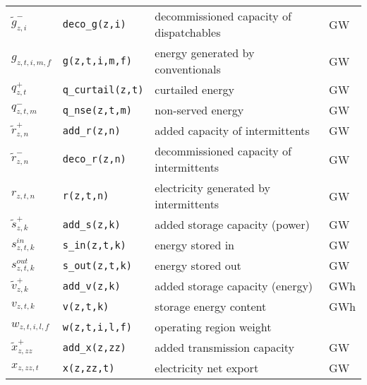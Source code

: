 \documentclass[review, 3p, times]{elsarticle} %
\begin{document}
\begin{table*}
\begin{tabulary}{\textwidth}{LLLL}
            $\widetilde{g}^{-}_{z,i}$     & \texttt{deco\_g(z,i)}         & decommissioned capacity of dispatchables & GW        \\
            $g_{z,t,i,m,f}$               & \texttt{g(z,t,i,m,f)}         & energy generated by conventionals & GW        \\
            $q^{+}_{z,t}$                 & \texttt{q\_curtail(z,t)}      & curtailed energy & GW        \\
            $q^{-}_{z,t,m}$               & \texttt{q\_nse(z,t,m)}        & non-served energy & GW        \\
            $\widetilde{r}^{+}_{z,n}$     & \texttt{add\_r(z,n)}          & added capacity of intermittents & GW        \\
            $\widetilde{r}^{-}_{z,n}$     & \texttt{deco\_r(z,n)}         & decommissioned capacity of intermittents & GW        \\
            $r_{z,t,n}$                   & \texttt{r(z,t,n)}             & electricity generated by intermittents & GW        \\
            $\widetilde{s}^{+}_{z,k}$     & \texttt{add\_s(z,k)}          & added storage capacity (power)              & GW        \\
            $s^{in}_{z,t,k}$              & \texttt{s\_in(z,t,k)}         & energy stored in & GW        \\
            $s^{out}_{z,t,k}$             & \texttt{s\_out(z,t,k)}        & energy stored out & GW        \\
            $\widetilde{v}^{+}_{z,k}$     & \texttt{add\_v(z,k)}          & added storage capacity (energy)             & GWh       \\
            $v_{z,t,k}$                   & \texttt{v(z,t,k)}             & storage energy content & GWh       \\
            $w_{z,t,i,l,f}$               & \texttt{w(z,t,i,l,f)}         & operating region weight &           \\
            $\widetilde{x}^{+}_{z,zz}$    & \texttt{add\_x(z,zz)}         & added transmission capacity & GW        \\
            $x_{z,zz,t}$                  & \texttt{x(z,zz,t)}            & electricity net export & GW        \\
            \bottomrule
        \end{tabulary}
    \end{table*}

    \newpage
\end{document}
